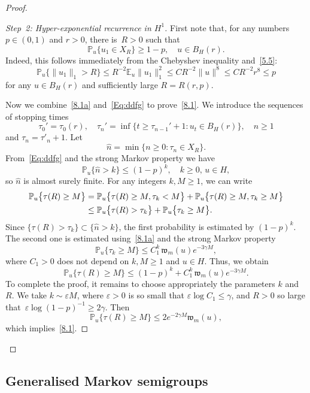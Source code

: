 \documentclass[10pt]{amsart}
\theoremstyle{definition}\newtheorem{defi}[theo]{Definition}\newtheorem{rema}[theo]{Remark}\newtheorem{exam}[theo]{Example}\newtheorem{exem}[theo]{Example}\newtheorem{nota}[theo]{Notation}
\newcommand{\IP}{{\mathbb P}}
\newcommand{\E}{{\mathbb E}}
\newcommand{\wwww}{{\mathfrak w}}
\begin{document}
\begin{proof}
\begin{proof}[Step~2: Hyper-exponential recurrence in $H^1$]
First note that, for any numbers $p\in (0,1)$ and $ r>0$, there is~$R>0$ such that
\begin{equation}\label{Eq:ddfg}
\IP_u\bigl\{u_1\in X_R\bigr\}\ge 1-p, \quad u\in B_H(r).
\end{equation}
Indeed, this follows immediately from the Chebyshev inequality and~\eqref{5.5}:
\[
\IP_u\bigl\{\|u_1\|_1>R\big\}\le R^{-2} \E_u \|u_1\|_1^2\le C R^{-2} \|u\|^8\le C R^{-2} r^8\le p
\]
for any $u\in B_H(r)$ and sufficiently large $R=R(r,p)$.

Now we combine~\eqref{8.1a} and~\eqref{Eq:ddfg} to prove~\eqref{8.1}. We introduce the sequences of stopping times
\[
\tau_0'=\tau_0(r), \quad \tau_n'=\inf\{t\ge \tau_{n-1}'+1: u_t\in B_H(r)\}, \quad n\ge1
\]
and $\tau_n=\tau'_n+1$. Let
\[
\hat n=\min\{n\ge0: \tau_n\in X_R\}.
\]
From~\eqref{Eq:ddfg} and the strong Markov property we have
\[
\IP_u\{\hat n > k\} \le (1 - p)^k, \quad k \ge 0,\, u \in H,
\]
so $\hat n$ is almost surely finite. For any integers $k,M\ge1$, we can write
\begin{align*}
\IP_u\bigl\{\tau(R)\ge M\bigr\}&=\IP_u\bigl\{\tau(R)\ge M,\tau_k<M\bigr\}+\IP_u\bigl\{\tau(R)\ge M,\tau_k\ge M\bigr\}
\notag\\
&\le \IP_u\bigl\{\tau(R)>\tau_k\bigr\}+\IP_u\bigl\{\tau_k\ge M\bigr\}.
\end{align*}
Since $\{\tau(R)>\tau_k\}\subset\{\hat n>k\}$, the first probability is estimated by $(1 - p)^k$. The second one is estimated using~\eqref{8.1a} and the strong Markov property
\[
\IP_u\bigl\{\tau_k\ge M\bigr\}\le C_1^k\,\wwww_m(u)e^{-3\gamma M},
\]
where $C_1>0$ does not depend on $k, M\ge1$ and $u\in H$.
Thus, we obtain
\[
\IP_u\bigl\{\tau(R)\ge M\bigr\}\le (1-p)^k+C_1^k\,\wwww_m(u)e^{-3\gamma M}.
\]
To complete the proof, it remains to choose appropriately the parameters $k$ and~$R$.
We take $k\sim \varepsilon M$, where $\varepsilon>0$ is so small that $\varepsilon\log C_1\le \gamma$, and $R>0$ so large that~$\varepsilon\log(1-p)^{-1}\ge2\gamma$. Then
\[
\IP_u\bigl\{\tau(R)\ge M\bigr\}\le 2e^{-2\gamma M}\wwww_m(u),
\]
which implies~\eqref{8.1}.
\end{proof}
\let\qed\relax
\end{proof}

\subsection{Generalised Markov semigroups}\label{S:5.2}
\end{document}
